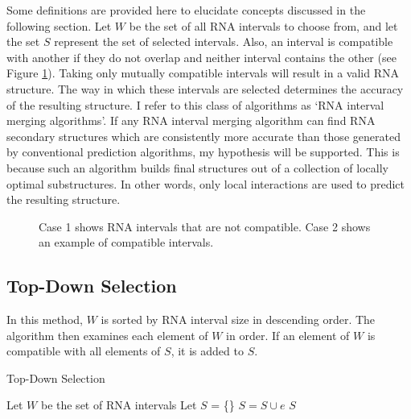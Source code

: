 \documentclass{cshonours}
\begin{document}
Some definitions are provided here to elucidate concepts discussed in the following section. Let $W$ be the set of all RNA intervals to choose from, and let the set $S$ represent the set of selected intervals. Also, an interval is compatible with another if they do not overlap and neither interval contains the other (see Figure \ref{fig:compatible}). Taking only mutually compatible intervals will result in a valid RNA  structure. The way in which these intervals are selected determines the accuracy of the resulting structure. I refer to this class of algorithms as `RNA interval merging algorithms'. If any RNA interval merging algorithm can find RNA secondary structures which are consistently more accurate than those generated by conventional prediction algorithms, my hypothesis will be supported. This is because such an algorithm builds final structures out of a collection of locally optimal substructures. In other words, only local interactions are used to predict the resulting structure.

\begin{figure}
\begin{center}
\end{center}
\caption{Case 1 shows RNA intervals that are not compatible. Case 2 shows an example of compatible intervals.}
\label{fig:compatible}
\end{figure}


\subsection{Top-Down Selection}
In this method, $W$ is sorted by RNA interval size in descending order. The algorithm then examines each element of $W$ in order. If an element of $W$ is compatible with all elements of $S$, it is added to $S$.

\begin{algorithm}
  \caption{Top-Down Selection}
  \label{tds}
  \begin{algorithmic}[1]
  \State Let $W$ be the set of RNA intervals
  \State Let $S$ = \{\}
  \State {}
  		\State $S = S \cup e$
  	\EndIf
  \EndFor
  \State \Return $S$
  \end{algorithmic}
\end{algorithm}
\end{document}
